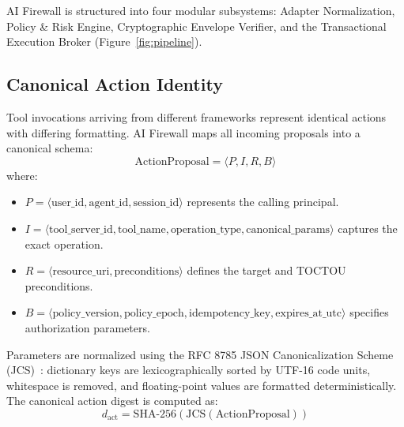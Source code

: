 \documentclass[sigconf,anonymous,review]{acmart}
\begin{document}
AI Firewall is structured into four modular subsystems: Adapter Normalization, Policy \& Risk Engine, Cryptographic Envelope Verifier, and the Transactional Execution Broker (Figure~\ref{fig:pipeline}).

\subsection{Canonical Action Identity}
Tool invocations arriving from different frameworks represent identical actions with differing formatting. AI Firewall maps all incoming proposals into a canonical schema:
\begin{equation}
\text{ActionProposal} = \langle P, I, R, B \rangle
\end{equation}
where:
\begin{itemize}
    \item $P = \langle \text{user\_id}, \text{agent\_id}, \text{session\_id} \rangle$ represents the calling principal.
    \item $I = \langle \text{tool\_server\_id}, \text{tool\_name}, \text{operation\_type}, \text{canonical\_params} \rangle$ captures the exact operation.
    \item $R = \langle \text{resource\_uri}, \text{preconditions} \rangle$ defines the target and TOCTOU preconditions.
    \item $B = \langle \text{policy\_version}, \text{policy\_epoch}, \text{idempotency\_key}, \text{expires\_at\_utc} \rangle$ specifies authorization parameters.
\end{itemize}

Parameters are normalized using the RFC 8785 JSON Canonicalization Scheme (JCS)~\cite{rfc8785}: dictionary keys are lexicographically sorted by UTF-16 code units, whitespace is removed, and floating-point values are formatted deterministically. The canonical action digest is computed as:
\begin{equation}
d_{\text{act}} = \text{SHA-256}(\text{JCS}(\text{ActionProposal}))
\end{equation}
\end{document}
